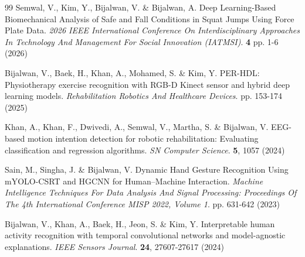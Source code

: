 \documentclass[conference]{IEEEtran}
\begin{document}
\begin{thebibliography}{99}
Semwal, V., Kim, Y., Bijalwan, V. \& Bijalwan, A. Deep Learning-Based Biomechanical Analysis of Safe and Fall Conditions in Squat Jumps Using Force Plate Data. {\em 2026 IEEE International Conference On Interdisciplinary Approaches In Technology And Management For Social Innovation (IATMSI)}. \textbf{4} pp. 1-6 (2026)

Bijalwan, V., Baek, H., Khan, A., Mohamed, S. \& Kim, Y. PER-HDL: Physiotherapy exercise recognition with RGB-D Kinect sensor and hybrid deep learning models. {\em Rehabilitation Robotics And Healthcare Devices}. pp. 153-174 (2025)

Khan, A., Khan, F., Dwivedi, A., Semwal, V., Martha, S. \& Bijalwan, V. EEG-based motion intention detection for robotic rehabilitation: Evaluating classification and regression algorithms. {\em SN Computer Science}. \textbf{5}, 1057 (2024)

Sain, M., Singha, J. \& Bijalwan, V. Dynamic Hand Gesture Recognition Using mYOLO-CSRT and HGCNN for Human–Machine Interaction. {\em Machine Intelligence Techniques For Data Analysis And Signal Processing: Proceedings Of The 4th International Conference MISP 2022, Volume 1}. pp. 631-642 (2023)

Bijalwan, V., Khan, A., Baek, H., Jeon, S. \& Kim, Y. Interpretable human activity recognition with temporal convolutional networks and model-agnostic explanations. {\em IEEE Sensors Journal}. \textbf{24}, 27607-27617 (2024)


\end{thebibliography}
\end{document}
